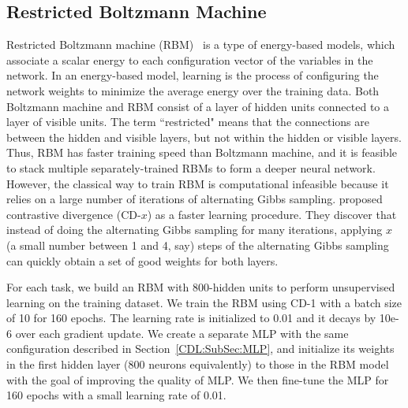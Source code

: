 \subsection{Restricted Boltzmann Machine}
Restricted Boltzmann machine (RBM)~\cite{DeepBeliefNets} is a type of energy-based models, which associate a scalar energy to each configuration vector of the variables in the network.
In an energy-based model, learning is the process of configuring the network weights to minimize the average energy over the training data.
Both Boltzmann machine and RBM consist of a layer of hidden units connected to a layer of visible units.
The term ``restricted" means that the connections are between the hidden and visible layers, but not within the hidden or visible layers.
Thus, RBM has faster training speed than Boltzmann machine, and it is feasible to stack multiple separately-trained RBMs to form a deeper neural network.
However, the classical way to train RBM is computational infeasible because it relies on a large number of iterations of alternating Gibbs sampling.
\cite{DeepBeliefNets} proposed contrastive divergence (CD-$x$) as a faster learning procedure.
They discover that instead of doing the alternating Gibbs sampling for many iterations,
applying $x$ (a small number between 1 and 4, say) steps of the alternating Gibbs sampling can quickly obtain a set of good weights for both layers.

For each task, we build an RBM with 800-hidden units to perform unsupervised learning on the training dataset.
We train the RBM using CD-1 with a batch size of 10 for 160 epochs.
The learning rate is initialized to 0.01 and it decays by 10e-6 over each gradient update.
We create a separate MLP with the same configuration described in Section~\ref{CDL:SubSec:MLP}, and initialize its weights in the first hidden layer (800 neurons equivalently) to those in the RBM model with the goal of improving the quality of MLP.
We then fine-tune the MLP for 160 epochs with a small learning rate of 0.01.


